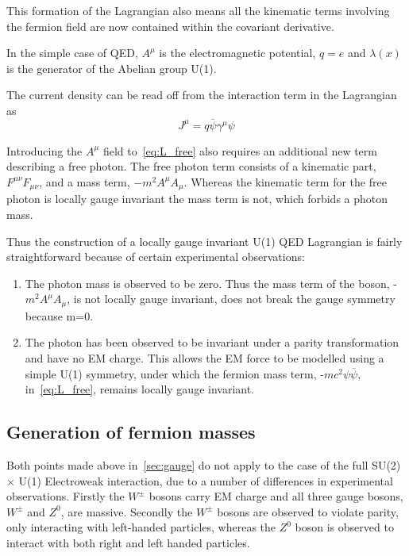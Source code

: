 This formation of the Lagrangian also means all the kinematic terms involving the fermion field are now contained within the covariant derivative.

In the simple case of QED, $A^{\mu}$ is the electromagnetic potential, $q = e$ and $\lambda(x)$ is the generator of the Abelian group U(1).

The current density can be read off from the interaction term in the Lagrangian as
\begin{equation}
  J^{\mu} = q\overline{\psi}\gamma^{\mu}\psi
\end{equation}

Introducing the $A^{\mu}$ field to~\autoref{eq:L_free} also requires an additional new term describing a free photon. The free photon term consists of a kinematic part, $F^{\mu\nu}F_{\mu\nu}$, and a mass term, $-m^{2}A^{\mu}A_{\mu}$. Whereas the kinematic term for the free photon is locally gauge invariant the mass term is not, which forbids a photon mass.

Thus the construction of a locally gauge invariant U(1) QED Lagrangian is fairly straightforward because of certain experimental observations:
\begin{enumerate}
\item
  The photon mass is observed to be zero. Thus the mass term of the boson, -$m^{2}A^{\mu}A_{\mu}$, is not locally gauge invariant, does not break the gauge symmetry because m=0.
\item
  The photon has been observed to be invariant under a parity transformation and have no EM charge. This allows the EM force to be modelled using a  simple U(1) symmetry, under which the fermion mass term, -$mc^{2}\psi\overline{\psi}$, in~\autoref{eq:L_free}, remains locally gauge invariant.

\end{enumerate}
\subsection{Generation of fermion masses}
Both points made above in~\autoref{sec:gauge} do not apply to the case of the full SU(2) $\times$ U(1) Electroweak interaction, due to a number of differences in experimental observations. Firstly the $W^{\pm}$ bosons carry EM charge and all three gauge bosons, $W^{\pm}$ and $Z^{0}$, are massive. Secondly the $W^{\pm}$ bosons are observed to violate parity, only interacting with left-handed particles, whereas the $Z^{0}$ boson is observed to interact with both right and left handed particles. 

